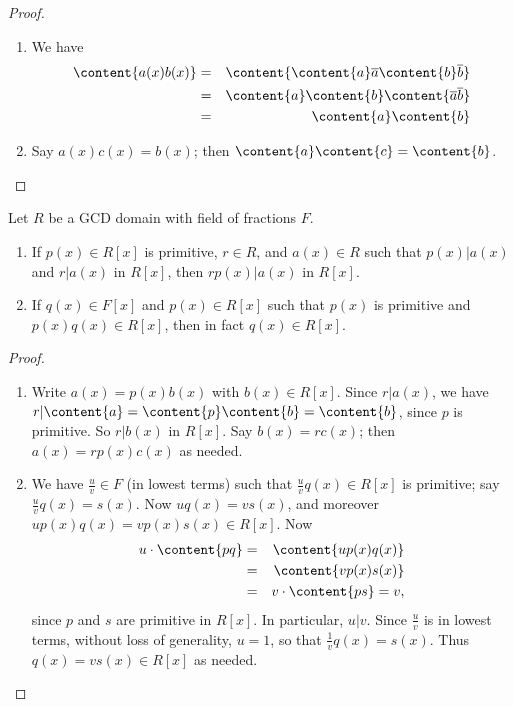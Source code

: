 \documentclass{article}
\begin{document}
\begin{proof}
\begin{enumerate}
\item We have
\begin{eqnarray*}
\content{a(x)b(x)} & = & \content{\content{a}\overline{a}\content{b}\overline{b}} \\
 & = & \content{a}\content{b}\content{\overline{a}\overline{b}} \\
 & = & \content{a}\content{b}
\end{eqnarray*}

\item Say $a(x)c(x) = b(x)$; then $\content{a}\content{c} = \content{b}$. \qedhere
\end{enumerate}
\end{proof}

\begin{lem}
Let $R$ be a GCD domain with field of fractions $F$.
\begin{enumerate}
\item If $p(x) \in R[x]$ is primitive, $r \in R$, and $a(x) \in R$ such that $p(x)|a(x)$ and $r|a(x)$ in $R[x]$, then $rp(x)|a(x)$ in $R[x]$.
\item If $q(x) \in F[x]$ and $p(x) \in R[x]$ such that $p(x)$ is primitive and $p(x)q(x) \in R[x]$, then in fact $q(x) \in R[x]$.
\end{enumerate}
\end{lem}

\begin{proof} \mbox{}
\begin{enumerate}
\item Write $a(x) = p(x)b(x)$ with $b(x) \in R[x]$. Since $r|a(x)$, we have $r|\content{a} = \content{p}\content{b} = \content{b}$, since $p$ is primitive. So $r|b(x)$ in $R[x]$. Say $b(x) = rc(x)$; then $a(x) = rp(x)c(x)$ as needed.

\item We have $\frac{u}{v} \in F$ (in lowest terms) such that $\frac{u}{v}q(x) \in R[x]$ is primitive; say $\frac{u}{v}q(x) = s(x)$. Now $uq(x) = vs(x)$, and moreover $up(x)q(x) = vp(x)s(x) \in R[x]$. Now
\begin{eqnarray*}
u \cdot \content{pq} & = & \content{up(x)q(x)} \\
 & = & \content{vp(x)s(x)} \\
 & = & v \cdot \content{ps} = v,
\end{eqnarray*}
since $p$ and $s$ are primitive in $R[x]$. In particular, $u|v$. Since $\frac{u}{v}$ is in lowest terms, without loss of generality, $u = 1$, so that $\frac{1}{v}q(x) = s(x)$. Thus $q(x) = vs(x) \in R[x]$ as needed. \qedhere
\end{enumerate}
\end{proof}
\end{document}

